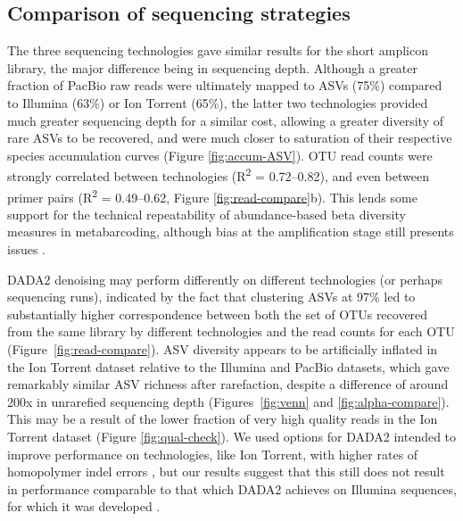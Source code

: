 \documentclass[
  12pt,
]{article}
\begin{document}
\hypertarget{comparison-of-sequencing-strategies}{%
\subsection{Comparison of sequencing strategies}\label{comparison-of-sequencing-strategies}}

The three sequencing technologies gave similar results for the short amplicon library, the major difference being in sequencing depth.
Although a greater fraction of PacBio raw reads were ultimately mapped to ASVs (75\%) compared to Illumina (63\%) or Ion Torrent (65\%),
the latter two technologies provided much greater sequencing depth for a similar cost, allowing a greater diversity of rare ASVs to be recovered, and were much closer to saturation of their respective species accumulation curves (Figure \ref{fig:accum-ASV}).
OTU read counts were strongly correlated between technologies (R\textsuperscript{2} = 0.72--0.82),
and even between primer pairs (R\textsuperscript{2} = 0.49--0.62, Figure \ref{fig:read-compare}b).
This lends some support for the technical repeatability of abundance-based beta diversity measures in metabarcoding, although bias at the amplification stage still presents issues \autocite{polz1998,Kanagawa_2003,bellemain2010,castano2020}.

DADA2 denoising may perform differently on different technologies (or perhaps sequencing runs), indicated by the fact that clustering ASVs at 97\% led to substantially higher correspondence between both the set of OTUs recovered from the same library by different technologies and the read counts for each OTU (Figure~\ref{fig:read-compare}).
ASV diversity appears to be artificially inflated in the Ion Torrent dataset relative to the Illumina and PacBio datasets, which gave remarkably similar ASV richness after rarefaction, despite a difference of around 200x in unrarefied sequencing depth (Figures~\ref{fig:venn} and \ref{fig:alpha-compare}).
This may be a result of the lower fraction of very high quality reads in the Ion Torrent dataset (Figure \ref{fig:qual-check}).
We used options for DADA2 intended to improve performance on technologies, like Ion Torrent, with higher rates of homopolymer indel errors \autocite{callahan2020b}, but our results suggest that this still does not result in performance comparable to that which DADA2 achieves on Illumina sequences, for which it was developed \autocite{callahan2016}.
\end{document}
